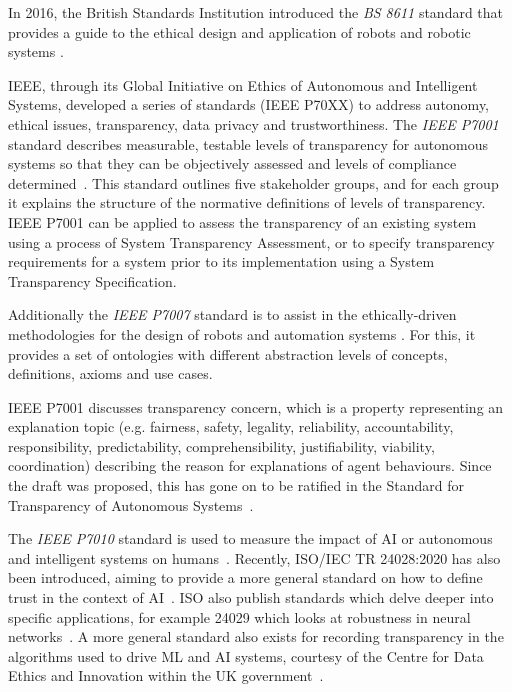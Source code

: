 In 2016, the British Standards Institution introduced the \textit{BS 8611} standard that provides a guide to the ethical design and application of robots and robotic systems \cite{BS8611}. 

IEEE, through its  Global Initiative on Ethics of Autonomous and Intelligent Systems, developed a series of standards (IEEE P70XX) to address autonomy, ethical issues, transparency, data privacy and trustworthiness. The \textit{IEEE P7001} standard describes measurable, testable levels of transparency for autonomous systems so that they can be objectively assessed and levels of compliance determined~\cite{IEEE-P7001}. This standard outlines five stakeholder groups, and for each group it explains the structure of the normative definitions of levels of transparency. IEEE P7001 can be applied to assess the transparency of an existing system using a process of System Transparency Assessment, or to specify transparency requirements for a system prior to its implementation using a System Transparency Specification.

Additionally the \textit{IEEE P7007} standard is to assist in the ethically-driven methodologies for the design of robots and automation systems \cite{IEEE-P7007}. For this, it provides a set of ontologies with different abstraction levels of concepts, definitions, axioms and use cases. 

IEEE P7001 discusses transparency concern, which is a property representing an explanation topic (e.g. fairness, safety, legality, reliability, accountability, responsibility, predictability, comprehensibility, justifiability, viability, coordination) describing the reason for explanations of agent behaviours. Since the draft was proposed, this has gone on to be ratified in the Standard for Transparency of Autonomous Systems~\cite{FinalP7001}.

The \textit{IEEE P7010} standard is used to measure the impact of AI or autonomous and intelligent systems on humans~\cite{IEEE-P7010}. Recently, ISO/IEC TR 24028:2020 has also been introduced, aiming to provide a more general standard on how to define trust in the context of AI~\cite{24028}. ISO also publish standards which delve deeper into specific applications, for example 24029 which looks at robustness in neural networks~\cite{24029}.
A more general standard also exists for recording transparency in the algorithms used to drive ML and AI systems, courtesy of the Centre for Data Ethics and Innovation within the UK government~\cite{cdei}.


